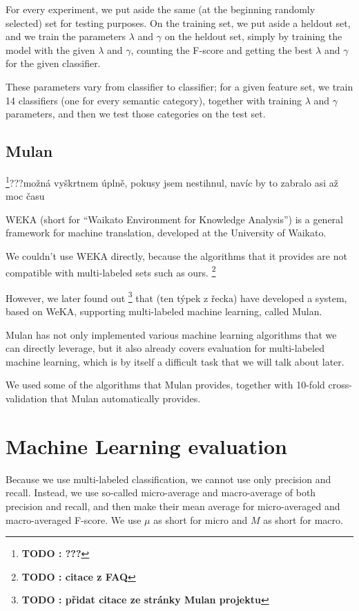 \documentclass[letterpaper]{article}
\newcommand{\todofn}[1] {
 \footnote{\textbf{TODO : #1}}}
\begin{document}
For every experiment, we put aside the same (at the beginning randomly selected) set for testing purposes. 
On the training set, we put aside a heldout set, and we train the parameters $\lambda$ and $\gamma$ on the heldout set, simply by training the model with the given $\lambda$ and $\gamma$, counting the F-score and getting the best $\lambda$ and $\gamma$ for the given classifier.

These parameters vary from classifier to classifier; for a given feature set, we train 14 classifiers (one for every semantic category), together with training $\lambda$ and $\gamma$ parameters, and then we test those categories on the test set.

\subsection{Mulan}
\todofn{???}???možná vyškrtnem úplně, pokusy jsem nestihnul, navíc by to zabralo asi až moc času

WEKA (short for ``Waikato Environment for Knowledge Analysis'') is a general framework for machine translation, developed at the University of Waikato.

We couldn't use WEKA directly, because the algorithms that it provides are not compatible with multi-labeled sets such as ours. \todofn{citace z FAQ}

However, we later found out \todofn{přidat citace ze stránky Mulan projektu} that (ten týpek z řecka) have developed a system, 
based on WeKA, supporting multi-labeled machine learning, called Mulan.

Mulan has not only implemented various machine learning algorithms that we can directly leverage, but it also already 
covers evaluation for multi-labeled machine learning, which is by itself a difficult task that we will talk about later.

We used some of the algorithms that Mulan provides, together with 10-fold cross-validation that Mulan automatically provides.

\section{Machine Learning evaluation}
Because we use multi-labeled classification, we cannot use only precision and recall. Instead, we use so-called micro-average and macro-average of both precision and recall, and then make their mean average for micro-averaged and macro-averaged F-score. We use $\mu$ as short for micro and $M$ as short for macro.
\end{document}
